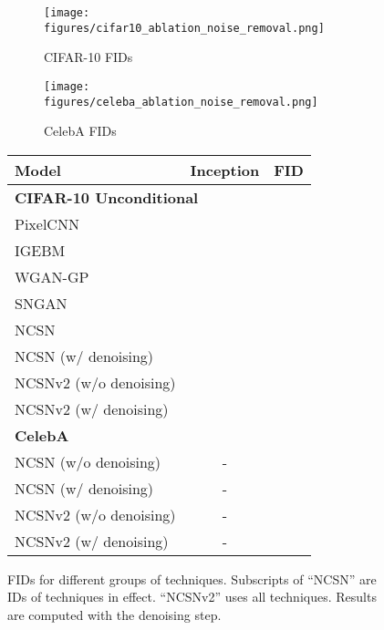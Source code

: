\documentclass{article}
\begin{document}
\begin{figure}
    \centering
    \begin{minipage}{0.53\textwidth}
        \centering
            \begin{subfigure}[b]{0.5\textwidth}
            \texttt{[image: figures/cifar10\_ablation\_noise\_removal.png]}
            \caption{CIFAR-10 FIDs}\label{fig:fid_cifar10}
        \end{subfigure}\begin{subfigure}[b]{0.5\textwidth}
            \texttt{[image: figures/celeba\_ablation\_noise\_removal.png]}
            \caption{CelebA FIDs}\label{fig:fid_celeba}
        \end{subfigure}
        \caption{FIDs for different groups of techniques. Subscripts of ``NCSN'' are IDs of techniques in effect. ``NCSNv2'' uses all techniques. Results are computed with the denoising step.}
        \label{fig:ablation}
    \end{minipage}
    \begin{minipage}{0.45\textwidth}
     \label{tab:full_scores}
    \vspace{-0.5em}
       \centering
            \begin{adjustbox}{max width=0.9\linewidth}
            \begin{tabular}{lcc}
                \toprule
                Model & Inception  & FID \\
                \midrule
                \multicolumn{3}{l}{\textbf{CIFAR-10 Unconditional}} \\
                \midrule
                PixelCNN~\cite{van2016conditional} &  & \\
                IGEBM~\cite{du2019implicit} &  &  \\
                WGAN-GP~\cite{gulrajani2017improved} &  & \\
                SNGAN~\cite{miyato2018spectral} &  &  \\
                \midrule
                NCSN~\cite{song2019generative} &  & \\
                NCSN (w/ denoising) &  & \\
                NCSNv2 (w/o denoising) &  & \\
                NCSNv2 (w/ denoising) &  & \\
                \midrule
                \multicolumn{3}{l}{\textbf{CelebA }}\\
                \midrule
                NCSN (w/o denoising) & - &  \\
                NCSN (w/ denoising) & - & \\
                NCSNv2 (w/o denoising) & - & \\
                NCSNv2 (w/ denoising) & - & \\
                \bottomrule
            \end{tabular} 
            \end{adjustbox}
    \end{minipage}
\end{figure}
\end{document}
